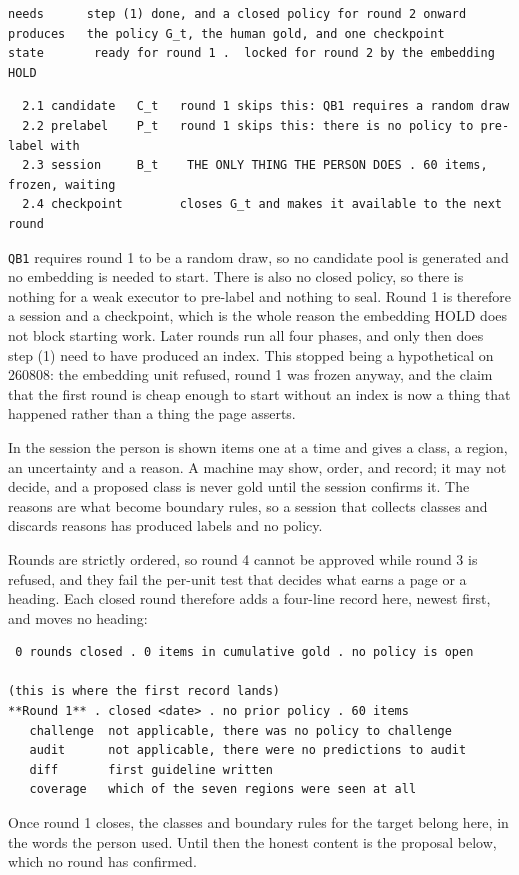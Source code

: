 \begin{verbatim}
needs      step (1) done, and a closed policy for round 2 onward
produces   the policy G_t, the human gold, and one checkpoint
state       ready for round 1 .  locked for round 2 by the embedding HOLD
\end{verbatim}
\begin{verbatim}
  2.1 candidate   C_t   round 1 skips this: QB1 requires a random draw
  2.2 prelabel    P_t   round 1 skips this: there is no policy to pre-label with
  2.3 session     B_t    THE ONLY THING THE PERSON DOES . 60 items, frozen, waiting
  2.4 checkpoint        closes G_t and makes it available to the next round
\end{verbatim}
\texttt{QB1} requires round 1 to be a random draw, so no candidate pool is generated and no embedding is needed to start. There is also no closed policy, so there is nothing for a weak executor to pre-label and nothing to seal. Round 1 is therefore a session and a checkpoint, which is the whole reason the embedding HOLD does not block starting work. Later rounds run all four phases, and only then does step (1) need to have produced an index. This stopped being a hypothetical on 260808: the embedding unit refused, round 1 was frozen anyway, and the claim that the first round is cheap enough to start without an index is now a thing that happened rather than a thing the page asserts.

In the session the person is shown items one at a time and gives a class, a region, an uncertainty and a reason. A machine may show, order, and record; it may not decide, and a proposed class is never gold until the session confirms it. The reasons are what become boundary rules, so a session that collects classes and discards reasons has produced labels and no policy.

Rounds are strictly ordered, so round 4 cannot be approved while round 3 is refused, and they fail the per-unit test that decides what earns a page or a heading. Each closed round therefore adds a four-line record here, newest first, and moves no heading:

\begin{verbatim}
 0 rounds closed . 0 items in cumulative gold . no policy is open

(this is where the first record lands)
**Round 1** . closed <date> . no prior policy . 60 items
   challenge  not applicable, there was no policy to challenge
   audit      not applicable, there were no predictions to audit
   diff       first guideline written
   coverage   which of the seven regions were seen at all
\end{verbatim}
Once round 1 closes, the classes and boundary rules for the target belong here, in the words the person used. Until then the honest content is the proposal below, which no round has confirmed.

